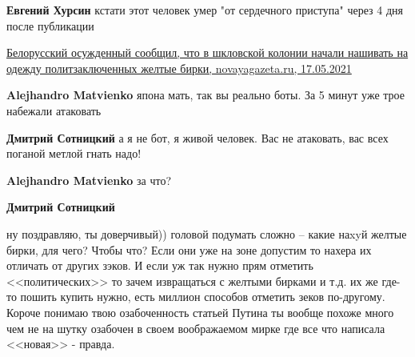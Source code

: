 \begin{itemize}
\begin{itemize}
 
\textbf{Евгений Хурсин} кстати этот человек умер "от сердечного приступа" через 4 дня после публикации

\href{https://novayagazeta.ru/articles/2021/05/17/belorusskii-osuzhdennyi-soobshchil-chto-v-shklovskoi-kolonii-nachali-nashivat-na-odezhdu-politzakliuchennykh-zheltye-birki}{Белорусский осужденный сообщил, что в шкловской колонии начали нашивать на одежду политзаключенных желтые бирки, novayagazeta.ru, 17.05.2021%
}

 
\textbf{Alejhandro Matvienko} япона мать, так вы реально боты. За 5 минут уже трое набежали атаковать

 
\textbf{Дмитрий Сотницкий} а я не бот, я живой человек. Вас не атаковать, вас всех поганой метлой гнать надо!

 
\textbf{Alejhandro Matvienko} за что?

 
\textbf{Дмитрий Сотницкий} 

ну поздравляю, ты доверчивый)) головой подумать сложно – какие наxyй желтые
бирки, для чего? Чтобы что? Если они уже на зоне допустим то нахера их отличать
от других зэков. И если уж так нужно прям отметить <<политических>> то зачем
извращаться с желтыми бирками и т.д. их же где-то пошить купить нужно, есть
миллион способов отметить зеков по-другому. Короче понимаю твою озабоченность
статьей Путина ты вообще похоже много чем не на шутку озабочен в своем
воображаемом мирке где все что написала <<новая>> - правда.


\end{itemize}
\end{itemize}
